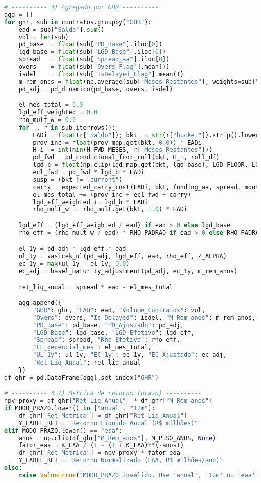 \documentclass[11pt,a4paper]{article}
\newcommand{\1}{\mathbf{1}}
\begin{document}
\begin{lstlisting}[language=Python, caption={risk_frontier.py}]
# ---------- 3) Agregado por GHR ----------
agg = []
for ghr, sub in contratos.groupby("GHR"):
    ead = sub["Saldo"].sum()
    vol = len(sub)
    pd_base  = float(sub["PD_Base"].iloc[0])
    lgd_base = float(sub["LGD_Base"].iloc[0])
    spread   = float(sub["Spread_aa"].iloc[0])
    overs    = float(sub["Overs_Flag"].mean())
    isdel    = float(sub["IsDelayed_Flag"].mean())
    m_rem_anos = float(np.average(sub["Meses_Restantes"], weights=sub["Saldo"]) / 12.0) if ead > 0 else 0.0
    pd_adj = pd_dinamico(pd_base, overs, isdel)

    el_mes_total = 0.0
    lgd_eff_weighted = 0.0
    rho_mult_w = 0.0
    for _, r in sub.iterrows():
        EADi = float(r["Saldo"]); bkt  = str(r["bucket"]).strip().lower()
        prov_inc = float(prov_map.get(bkt, 0.0)) * EADi
        H_i  = int(min(H_FWD_MESES, r["Meses_Restantes"]))
        pd_fwd = pd_condicional_from_roll(bkt, H_i, roll_df)
        lgd_b = float(np.clip(lgd_map.get(bkt, lgd_base), LGD_FLOOR, LGD_CAP))
        ecl_fwd = pd_fwd * lgd_b * EADi
        susp = (bkt != "current")
        carry = expected_carry_cost(EADi, bkt, funding_aa, spread, months=H_i, opex_map=opex_map, suspende_accrual=susp)
        el_mes_total += (prov_inc + ecl_fwd + carry)
        lgd_eff_weighted += lgd_b * EADi
        rho_mult_w += rho_mult.get(bkt, 1.0) * EADi

    lgd_eff = (lgd_eff_weighted / ead) if ead > 0 else lgd_base
    rho_eff = (rho_mult_w / ead) * RHO_PADRAO if ead > 0 else RHO_PADRAO

    el_1y = pd_adj * lgd_eff * ead
    ul_1y = vasicek_ul(pd_adj, lgd_eff, ead, rho_eff, Z_ALPHA)
    ec_1y = max(ul_1y - el_1y, 0.0)
    ec_adj = basel_maturity_adjustment(pd_adj, ec_1y, m_rem_anos)

    ret_liq_anual = spread * ead - el_mes_total

    agg.append({
        "GHR": ghr, "EAD": ead, "Volume_Contratos": vol,
        "Overs": overs, "Is_Delayed": isdel, "M_Rem_anos": m_rem_anos,
        "PD_Base": pd_base, "PD_Ajustado": pd_adj,
        "LGD_Base": lgd_base, "LGD_Efetivo": lgd_eff,
        "Spread": spread, "Rho_Efetivo": rho_eff,
        "EL_gerencial_mes": el_mes_total,
        "UL_1y": ul_1y, "EC_1y": ec_1y, "EC_Ajustado": ec_adj,
        "Ret_Liq_Anual": ret_liq_anual
    })
df_ghr = pd.DataFrame(agg).set_index("GHR")

# ---------- 3.1) Métrica de retorno (prazo) ----------
npv_proxy = df_ghr["Ret_Liq_Anual"] * df_ghr["M_Rem_anos"]
if MODO_PRAZO.lower() in ["anual", "12m"]:
    df_ghr["Ret_Metrica"] = df_ghr["Ret_Liq_Anual"]
    Y_LABEL_RET = "Retorno Líquido Anual (R$ milhões)"
elif MODO_PRAZO.lower() == "eaa":
    anos = np.clip(df_ghr["M_Rem_anos"], M_PISO_ANOS, None)
    fator_eaa = K_EAA / (1 - (1 + K_EAA)**(-anos))
    df_ghr["Ret_Metrica"] = npv_proxy * fator_eaa
    Y_LABEL_RET = "Retorno Normalizado (EAA, R$ milhões/ano)"
else:
    raise ValueError("MODO_PRAZO inválido. Use 'anual', '12m' ou 'eaa'.")


\end{lstlisting}
\end{document}
